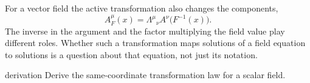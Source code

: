 \documentclass[11pt,a4paper]{article}
\begin{document}
For a vector field the active transformation also changes the components,
\[
  A_F^\mu(x)
  =\Lambda^\mu{}_\nu A^\nu\bigl(F^{-1}(x)\bigr).
\]
The inverse in the argument and the factor multiplying the field value play
different roles. Whether such a transformation maps solutions of a field
equation to solutions is a question about that equation, not just its
notation.

\begin{studentwork}[height=10.0cm]{derivation}
Derive the same-coordinate transformation law for a scalar field.
\end{studentwork}
\end{document}
